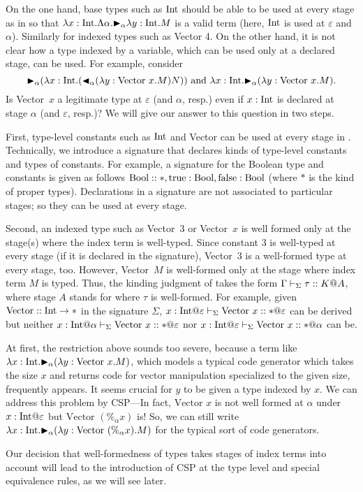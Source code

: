 On the one hand, base types such as \(\textrm{Int}\) should be able to be used
at every stage as in \LTP so that
\(\lambda x:\textrm{Int}.\Lambda \alpha. {\mathop{\blacktriangleright}}_\alpha \lambda y:\textrm{Int}.M\) is a valid
term (here, \(\textrm{Int}\) is used at \(\varepsilon\) and \(\alpha\)).
Similarly for indexed types such as Vector 4.  On the other hand, it
is not clear how a type indexed by a variable, which can be used only
at a declared stage, can be used.  For example,
consider
\[{\mathop{\blacktriangleright}}_\alpha (\lambda x:\textrm{Int}. ({\mathop{\blacktriangleleft}}_\alpha (\lambda y:\text{Vector
  }x.M)N) )
  \text{ and }
  \lambda x:\textrm{Int}. {\mathop{\blacktriangleright}}_\alpha (\lambda y:\text{Vector }x.M).
\]
Is Vector\ \(x\) a legitimate type at \(\varepsilon\) (and \(\alpha\),
resp.)  even if \(x:\textrm{Int}\) is declared at stage \(\alpha\) (and
\(\varepsilon\), resp.)?  We will give our answer to this question in two
steps.

First, type-level constants such as \(\textrm{Int}\) and Vector can be used at
every stage in \LMD.  Technically, we introduce a signature that
declares kinds of type-level constants and types of constants.  For
example, a signature for the Boolean type and constants is given as
follows $\textrm{Bool}::*, \text{true}:\textrm{Bool}, \text{false}:\textrm{Bool}$ (where $*$ is the
kind of proper types).  Declarations in a signature are not
associated to particular stages; so they can be used at every stage.

Second, an indexed type such as Vector\ 3 or Vector\ $x$ is well
formed only at the stage(s) where the index term is well-typed.  Since
constant \(3\) is well-typed at every stage (if it is declared in the
signature), Vector\ 3 is a well-formed type at every stage, too.
However, Vector\ $M$ is well-formed only at the stage where index term
$M$ is typed.  Thus, the kinding judgment
of \LMD takes the form \(\Gamma\vdash_\Sigma \tau :: K @ A\), where stage $A$ stands for
where \(\tau\) is well-formed.  For example,
given \(\text{Vector}:: \textrm{Int} \rightarrow *\) in the signature \(\Sigma\),
\(x:\I@\varepsilon \V \text{Vector }x :: * @\varepsilon\) can be
derived but
neither
\(x:\I@\alpha \V \text{Vector }x :: * @\varepsilon\)
nor 
\(x:\I@\varepsilon \V \text{Vector }x :: * @\alpha\)
can be.

At first, the restriction above sounds too severe, because a term like
\(\lambda x:\textrm{Int}. {\mathop{\blacktriangleright}}_\alpha (\lambda y:\text{Vector }x.M) \), which models a
typical code generator which takes the size $x$ and returns code for vector
manipulation specialized to the given size, frequently appears. It seems crucial
for \(y\) to be given a type indexed by $x$. We can address this problem by
CSP---In fact, $\text{Vector }x$ is not well formed at $\alpha$ under
$x:\I@\varepsilon$ but $\text{Vector }(\%_\alpha x)$ is! So, we can still
write \(\lambda x:\textrm{Int}. {\mathop{\blacktriangleright}}_\alpha (\lambda y:\text{Vector }(\%_\alpha x).M) \)
for the typical sort of code generators.

Our decision that well-formedness of types takes stages of index terms
into account will lead to the introduction of CSP at the type level
and special equivalence rules, as we will see later.
